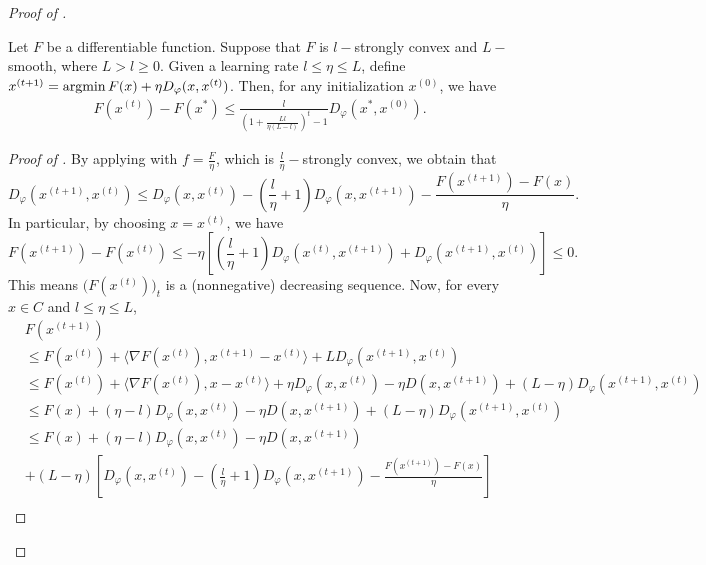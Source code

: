 \begin{proof}[Proof of ]
\begin{lemma}
\label{lemma:bppa_conv}
    Let $F$ be a differentiable function. Suppose that $F$ is $l-$strongly convex and $L-$ smooth,
    where $L > l \geq 0$. Given a learning rate $l \leq \eta \leq L$,
    define $x^{(t+1)} = \operatorname*{argmin} F(x) + \eta D_{\varphi}(x, x^{(t)})$.
    Then, for any initialization $x^{(0)}$, we have
    \begin{align}
        F(x^{(t)}) - F(x^*) \leq \frac{l}{\left( 1 + \frac{Ll }{\eta (L - l)} \right)^t - 1}
        D_{\varphi}(x^*, x^{(0)}).
\end{align}
\end{lemma}
\begin{proof}[Proof of ]
By applying  with $f = \frac{F}{\eta}$,
which is $\frac{l}{\eta}-$strongly convex, we obtain that
\begin{equation}
    D_{\varphi}(x^{(t+1)}, x^{(t)}) \leq D_{\varphi}(x, x^{(t)})
    - \left( \frac{l}{\eta} + 1 \right) D_{\varphi}(x, x^{(t+1)})
    - \frac{F(x^{(t+1)}) - F(x)}{\eta}.
\end{equation}
In particular, by choosing $x = x^{(t)}$, we have
\begin{equation}
    F(x^{(t+1)}) - F(x^{(t)}) \leq - \eta \left[ \left(\frac{l}{\eta} + 1 \right)
    D_{\varphi}(x^{(t)}, x^{(t+1)}) + D_{\varphi}(x^{(t+1)}, x^{(t)}) \right] \leq 0.
\end{equation}
This means $\big(F(x^{(t)}) \big)_t$ is a (nonnegative) decreasing sequence.
Now, for every $x \in C$ and $l \leq \eta \leq L$,
\begin{align}
    &F(x^{(t+1)}) \\
    &\leq F(x^{(t)}) + \langle \nabla F(x^{(t)}), x^{(t+1)} - x^{(t)} \rangle
    + L D_{\varphi}(x^{(t+1)}, x^{(t)}) \\
    &\leq F(x^{(t)}) + \langle \nabla F(x^{(t)}), x - x^{(t)} \rangle
    + \eta D_{\varphi}(x, x^{(t)}) - \eta D(x, x^{(t+1)})
    + (L - \eta) D_{\varphi}(x^{(t+1)}, x^{(t)}) \\
    &\leq F(x) + (\eta - l) D_{\varphi}(x, x^{(t)})
    - \eta D(x, x^{(t+1)}) + (L - \eta) D_{\varphi}(x^{(t+1)}, x^{(t)}) \\
    &\leq F(x) + (\eta - l) D_{\varphi}(x, x^{(t)}) - \eta D(x, x^{(t+1)}) \\
    &+ (L - \eta) \left[ D_{\varphi}(x, x^{(t)})
    - \left( \frac{l}{\eta} + 1 \right) D_{\varphi}(x, x^{(t+1)})
    - \frac{F(x^{(t+1)}) - F(x)}{\eta} \right] \\

\end{align}
\end{proof}
\end{proof}
